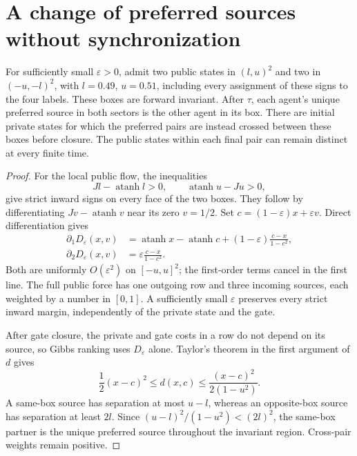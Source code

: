 \section{A change of preferred sources without synchronization}

For sufficiently small $\varepsilon>0$, admit two public states in $(l,u)^2$ and two in $(-u,-l)^2$, with $l=0.49$, $u=0.51$, including every assignment of these signs to the four labels. These boxes are forward invariant. After $\tau$, each agent's unique preferred source in both sectors is the other agent in its box. There are initial private states for which the preferred pairs are instead crossed between these boxes before closure. The public states within each final pair can remain distinct at every finite time.
\begin{proof}
For the local public flow, the inequalities
\begin{equation}
 Jl-\operatorname{atanh}l>0,\qquad
 \operatorname{atanh}u-Ju>0,
 \label{erase:well-margins}
\end{equation}
give strict inward signs on every face of the two boxes. They follow by differentiating $Jv-\operatorname{atanh}v$ near its zero $v=1/2$. Set $c=(1-\varepsilon)x+\varepsilon v$. Direct differentiation gives
\begin{equation}
 \begin{aligned}
 \partial_1D_\varepsilon(x,v)
 &=\operatorname{atanh}x-\operatorname{atanh}c
       +(1-\varepsilon)\frac{c-x}{1-c^2},\\
 \partial_2D_\varepsilon(x,v)
 &=\varepsilon\frac{c-x}{1-c^2}.
 \end{aligned}
 \label{erase:public-derivatives}
\end{equation}
Both are uniformly $O(\varepsilon^2)$ on $[-u,u]^2$; the first-order terms cancel in the first line. The full public force has one outgoing row and three incoming sources, each weighted by a number in $[0,1]$. A sufficiently small $\varepsilon$ preserves every strict inward margin, independently of the private state and the gate.

After gate closure, the private and gate costs in a row do not depend on its source, so Gibbs ranking uses $D_\varepsilon$ alone. Taylor's theorem in the first argument of $d$ gives
\begin{equation}
 \frac12(x-c)^2\leq d(x,c)
 \leq\frac{(x-c)^2}{2(1-u^2)}.
 \label{erase:cost-comparison}
\end{equation}
A same-box source has separation at most $u-l$, whereas an opposite-box source has separation at least $2l$. Since $(u-l)^2/(1-u^2)<(2l)^2$, the same-box partner is the unique preferred source throughout the invariant region. Cross-pair weights remain positive.


\end{proof}
